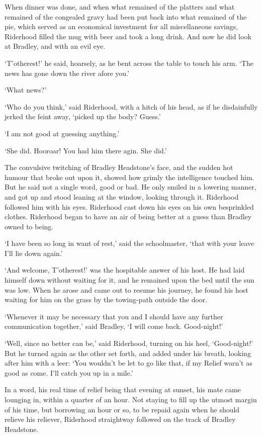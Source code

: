 When dinner was done, and when what remained of the platters and what
remained of the congealed gravy had been put back into what remained of
the pie, which served as an economical investment for all miscellaneous
savings, Riderhood filled the mug with beer and took a long drink. And
now he did look at Bradley, and with an evil eye.

‘T’otherest!’ he said, hoarsely, as he bent across the table to touch
his arm. ‘The news has gone down the river afore you.’

‘What news?’

‘Who do you think,’ said Riderhood, with a hitch of his head, as if he
disdainfully jerked the feint away, ‘picked up the body? Guess.’

‘I am not good at guessing anything.’

‘She did. Hooroar! You had him there agin. She did.’

The convulsive twitching of Bradley Headstone’s face, and the sudden
hot humour that broke out upon it, showed how grimly the intelligence
touched him. But he said not a single word, good or bad. He only smiled
in a lowering manner, and got up and stood leaning at the window,
looking through it. Riderhood followed him with his eyes. Riderhood cast
down his eyes on his own besprinkled clothes. Riderhood began to have an
air of being better at a guess than Bradley owned to being.

‘I have been so long in want of rest,’ said the schoolmaster, ‘that with
your leave I’ll lie down again.’

‘And welcome, T’otherest!’ was the hospitable answer of his host. He had
laid himself down without waiting for it, and he remained upon the bed
until the sun was low. When he arose and came out to resume his journey,
he found his host waiting for him on the grass by the towing-path
outside the door.

‘Whenever it may be necessary that you and I should have any further
communication together,’ said Bradley, ‘I will come back. Good-night!’

‘Well, since no better can be,’ said Riderhood, turning on his heel,
‘Good-night!’ But he turned again as the other set forth, and added
under his breath, looking after him with a leer: ‘You wouldn’t be let to
go like that, if my Relief warn’t as good as come. I’ll catch you up in
a mile.’

In a word, his real time of relief being that evening at sunset, his
mate came lounging in, within a quarter of an hour. Not staying to fill
up the utmost margin of his time, but borrowing an hour or so, to be
repaid again when he should relieve his reliever, Riderhood straightway
followed on the track of Bradley Headstone.

